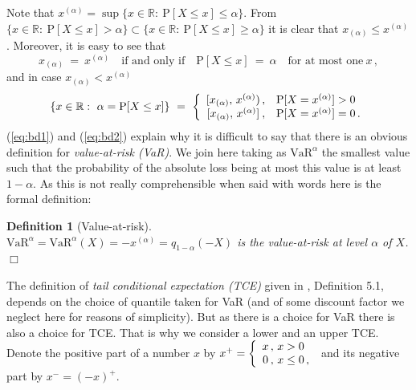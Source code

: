 \documentclass[11pt,a4paper,leqno]{article}
\newtheorem{definition}[theorem]{Definition}
\begin{document}
Note that $x^{(\alpha)} = \sup \{ x\in \mathbb{R}:\ \mathrm{P}[X \le x] \le \alpha \}$.
From $\{ x\in \mathbb{R}:\ \mathrm{P}[X \le x] > \alpha \} \subset  \{ x\in \mathbb{R}:\ \mathrm{P}[X \le x] \ge \alpha \}$
it is clear that $x_{(\alpha)} \le x^{(\alpha)}$. Moreover, it is easy to see that
\begin{equation}
x_{(\alpha)} \ =\ x^{(\alpha)}\quad \mbox{if and only if}\quad \mathrm{P}[X \le x] \ = \ \alpha\quad
\mbox{for at most one}\ x\,,
  \label{eq:bd1}
\end{equation}
and in case  $x_{(\alpha)} < x^{(\alpha)}$
\begin{equation}
 \{ x \in \mathbb{R}:\  \alpha = \mathrm{P}[X \le x]\} \ = \
\left\{
  \begin{array}{c@{\,,\quad}l}
{[} x_{(\alpha)},\, x^{(\alpha)}) & \mathrm{P}[ X = x^{(\alpha)}] > 0\\
{[} x_{(\alpha)},\, x^{(\alpha)}] & \mathrm{P}[ X = x^{(\alpha)}] = 0\,.
  \end{array}
\right.
  \label{eq:bd2}
\end{equation}
%
(\ref{eq:bd1}) and (\ref{eq:bd2}) explain why it is difficult to say
that there is an obvious definition for \emph{value-at-risk (VaR)}.
We join here \cite{Delb98} taking as $\mathrm{VaR}^\alpha$ the smallest value such
that the probability of the absolute loss being at most this value
is at least $1-\alpha$. As this is not really comprehensible when said
with words here is the formal definition:

\begin{definition}[Value-at-risk]
  \label{def:2}\ \\
$\mathrm{VaR}^\alpha = \mathrm{VaR}^\alpha(X) = - x^{(\alpha)} = q_{1-\alpha}(-X)$ is the \emph{value-at-risk}
at level $\alpha$ of $X$. \hfill $\Box$ 
\end{definition}

The definition of \emph{tail conditional expectation (TCE)} given in
\cite{ADEH99}, 
Definition 5.1,  depends on the choice
of quantile taken  for VaR (and of some discount factor we neglect here for reasons of simplicity).
But as there is a choice for VaR there is also a choice for TCE. That is why we consider a lower and
an upper TCE.
Denote the positive part of a number $x$ by $x^+ = \left\{ 
  \begin{array}{c@{\,,\ }l}
x & x > 0\\
0 & x \le 0\,,
  \end{array}
\right.
$ and its negative part by $x^- = (- x)^+$.
\end{document}
